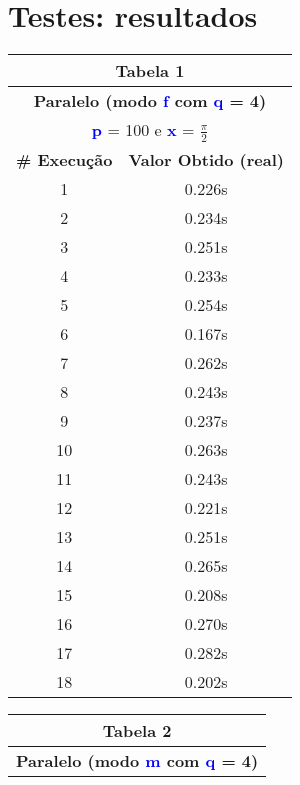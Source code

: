 \documentclass[11pt]{article}
\begin{document}
\section{Testes: resultados}
\begin{table}[!h]
	\begin{center}
		\begin{minipage}{0.48\textwidth}
			\begin{tabular}{| c | c |}
			\hline
			\multicolumn{2}{|c|}{\textbf{Tabela 1}} \\ \hline
			\multicolumn{2}{|c|}{\textbf{Paralelo (modo \textbf{\textcolor{blue}{f}} com \textbf{\textcolor{blue}{q}} = 4)}} \\
			\multicolumn{2}{|c|}{\textbf{\textcolor{blue}{p}} = 100 e \textbf{\textcolor{blue}{x}} = $\frac{\pi}{2}$} \\ [0.2ex]
			\hline
				\textbf{\# Execução} &  \textbf{Valor Obtido (real)} \\ \hline
				1 & 0.226s \\ \hline
				2 & 0.234s \\ \hline
				3 & 0.251s \\ \hline
				4 & 0.233s \\ \hline
				5 & 0.254s \\ \hline
				6 & 0.167s \\ \hline
				7 & 0.262s \\ \hline
				8 & 0.243s \\ \hline
				9 & 0.237s \\ \hline
				10 & 0.263s \\ \hline
				11 & 0.243s \\ \hline
				12 & 0.221s \\ \hline
				13 & 0.251s \\ \hline
				14 & 0.265s \\ \hline
				15 & 0.208s \\ \hline
				16 & 0.270s \\ \hline
				17 & 0.282s \\ \hline
				18 & 0.202s \\ \hline
			\end{tabular}
		\end{minipage}
		\begin{minipage}{0.48\textwidth}
			\begin{tabular}{| c | c |}
			\hline
			\multicolumn{2}{|c|}{\textbf{Tabela 2}} \\ \hline
			\multicolumn{2}{|c|}{\textbf{Paralelo (modo \textbf{\textcolor{blue}{m}} com \textbf{\textcolor{blue}{q}} = 4)}} \\

\end{tabular}
\end{minipage}
\end{center}
\end{table}
\end{document}
